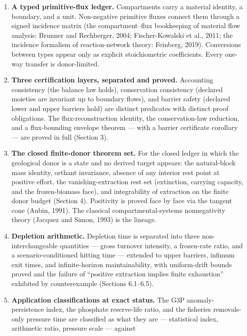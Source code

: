 \documentclass[11pt]{article}
\begin{document}
\begin{enumerate}
\def\labelenumi{\arabic{enumi}.}
\item
  \textbf{A typed primitive-flux ledger.} Compartments carry a material
  identity, a boundary, and a unit. Non-negative primitive fluxes
  connect them through a signed incidence matrix (the compartment--flux
  bookkeeping of material flow analysis: Brunner and Rechberger, 2004;
  Fischer-Kowalski et al., 2011; the incidence formalism of
  reaction-network theory: Feinberg, 2019). Conversions between types
  appear only as explicit stoichiometric coefficients. Every one-way
  transfer is donor-limited.
\item
  \textbf{Three certification layers, separated and proved.} Accounting
  consistency (the balance law holds), conservation consistency
  (declared moieties are invariant up to boundary flows), and barrier
  safety (declared lower and upper barriers hold) are distinct
  predicates with distinct proof obligations. The flux-reconstruction
  identity, the conservation-law reduction, and a flux-bounding envelope
  theorem --- with a barrier certificate corollary --- are proved in
  full (Section 3).
\item
  \textbf{The closed finite-donor theorem set.} For the closed ledger in
  which the geological donor is a state and no derived target appears:
  the natural-block mass identity, orthant invariance, absence of any
  interior rest point at positive effort, the vanishing-extraction rest
  set (extinction, carrying capacity, and the frozen-biomass face), and
  integrability of extraction on the finite donor budget (Section 4).
  Positivity is proved face by face via the tangent cone (Aubin, 1991).
  The classical compartmental-systems nonnegativity theory (Jacquez and
  Simon, 1993) is the lineage.
\item
  \textbf{Depletion arithmetic.} Depletion time is separated into three
  non-interchangeable quantities --- gross turnover intensity, a
  frozen-rate ratio, and a scenario-conditioned hitting time ---
  extended to upper barriers, infimum exit times, and infinite-horizon
  maintainability, with uniform-drift bounds proved and the failure of
  ``positive extraction implies finite exhaustion'' exhibited by
  counterexample (Sections 6.1--6.5).
\item
  \textbf{Application classifications at exact status.} The G3P
  anomaly-persistence index, the phosphate reserve-life ratio, and the
  fisheries removals-only pressure time are classified as what they are
  --- statistical index, arithmetic ratio, pressure scale --- against

\end{enumerate}
\end{document}
